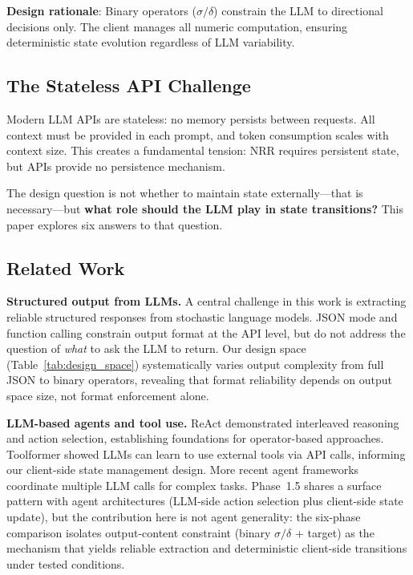\documentclass[11pt,a4paper]{article}
\begin{document}
\textbf{Design rationale}: Binary operators ($\sigma/\delta$) constrain the LLM to
directional decisions only. The client manages all numeric computation, ensuring
deterministic state evolution regardless of LLM variability.

\subsection{The Stateless API Challenge}

Modern LLM APIs are stateless: no memory persists between requests. All context
must be provided in each prompt, and token consumption scales with context size.
This creates a fundamental tension: NRR requires persistent state, but APIs provide
no persistence mechanism.

The design question is not whether to maintain state externally---that is
necessary---but \textbf{what role should the LLM play in state transitions?}
This paper explores six answers to that question.

\subsection{Related Work}

\textbf{Structured output from LLMs.}
A central challenge in this work is extracting reliable structured responses from
stochastic language models. JSON mode and function calling
\cite{openai2024structured} constrain output format at the API level, but do not
address the question of \textit{what} to ask the LLM to return. Our design space
(Table~\ref{tab:design_space}) systematically varies output complexity from full
JSON to binary operators, revealing that format reliability depends on output
space size, not format enforcement alone.

\textbf{LLM-based agents and tool use.}
ReAct \cite{yao2023react} demonstrated interleaved reasoning and action selection,
establishing foundations for operator-based approaches. Toolformer
\cite{schick2023toolformer} showed LLMs can learn to use external tools via API
calls, informing our client-side state management design. More recent agent
frameworks \cite{wang2024survey} coordinate multiple LLM calls for complex tasks.
Phase~1.5 shares a surface pattern with agent architectures (LLM-side action
selection plus client-side state update), but the contribution here is not
agent generality: the six-phase comparison isolates output-content constraint
(binary $\sigma/\delta$ + target) as the mechanism that yields reliable
extraction and deterministic client-side transitions under tested conditions.
\end{document}
